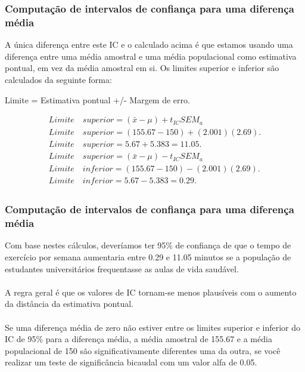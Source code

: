 \documentclass[11pt]{beamer}
\begin{document}
\begin{frame}
\frametitle{Computação de intervalos de confiança para uma diferença média}

A única diferença entre este IC e o calculado acima é que estamos usando uma diferença entre uma média amostral e uma média populacional como estimativa pontual, em vez da média amostral em si. Os limites superior e inferior são calculados da seguinte forma:

Limite = Estimativa pontual +/- Margem de erro.

\begin{align*}
Limite\quad superior = (\bar{x}-\mu) + t_{IC}SEM_a\\ 
Limite\quad superior = (155.67 - 150) + (2.001)(2.69).\\
Limite\quad superior = 5.67+5.383 = 11.05.\\
Limite\quad superior = (\bar{x}-\mu) - t_{IC}SEM_a\\
Limite\quad inferior = (155.67 - 150) - (2.001)(2.69).\\
Limite\quad inferior = 5.67-5.383 = 0.29.\\
\end{align*}

\end{frame}

\begin{frame}
\frametitle{Computação de intervalos de confiança para uma diferença média}

Com base nestes cálculos, deveríamos ter 95\% de confiança de que o tempo de exercício por semana aumentaria entre 0.29 e 11.05 minutos se a população de estudantes universitários frequentasse as aulas de vida saudável. \\~\\

A regra geral é que os valores de IC tornam-se menos plausíveis com o aumento da distância da estimativa pontual.\\~\\

Se uma diferença média de zero não estiver entre os limites superior e inferior do IC de 95\% para a diferença média, a média amostral de 155.67 e a média populacional de 150 são significativamente diferentes uma da outra, se você realizar um teste de significância bicaudal com um valor alfa de 0.05.

\end{frame}
\end{document}
